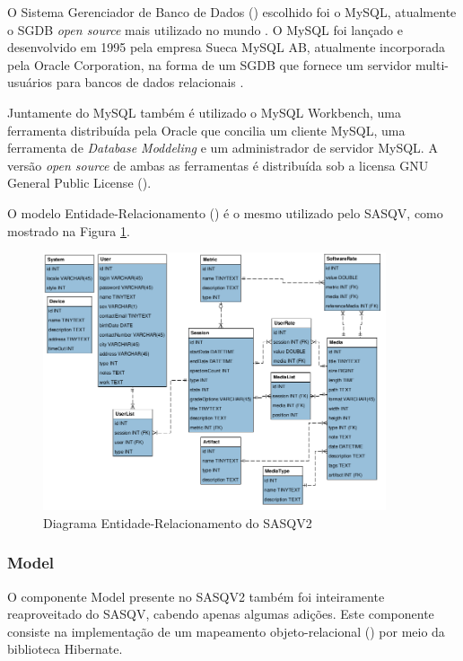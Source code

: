 O Sistema Gerenciador de Banco de Dados () escolhido foi o MySQL, atualmente o SGDB \emph{open source} mais utilizado no mundo \cite{mysqlmarket}.
O MySQL foi lançado e desenvolvido em 1995 pela empresa Sueca MySQL AB, atualmente incorporada pela Oracle Corporation, na forma de um SGDB que fornece um servidor multi-usuários para bancos de dados relacionais \cite{wikipediamysql}.

Juntamente do MySQL também é utilizado o MySQL Workbench, uma ferramenta distribuída pela Oracle que concilia um cliente MySQL, uma ferramenta de \emph{Database Moddeling} e um administrador de servidor MySQL.
A versão \emph{open source} de ambas as ferramentas é distribuída sob a licensa GNU General Public License ().

O modelo Entidade-Relacionamento () é o mesmo utilizado pelo SASQV, como mostrado na Figura \ref{fig:diagramaER}.

\begin{figure}[!htb]
	\centering
	\includegraphics[width=0.9\textwidth]{./imgs/diagramaER.png}
	\caption{Diagrama Entidade-Relacionamento do SASQV2}
	\label{fig:diagramaER}
\end{figure}

\subsubsection{Model}

O componente Model presente no SASQV2 também foi inteiramente reaproveitado do SASQV, cabendo apenas algumas adições. Este componente consiste na implementação de um mapeamento objeto-relacional () por meio da biblioteca Hibernate.

